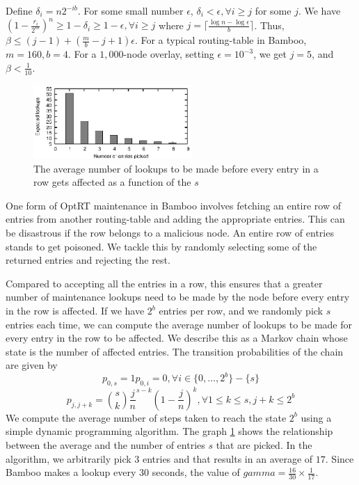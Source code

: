 \documentclass[10pt,twocolumn]{article}
\newcommand{\pow}[2]{\ensuremath{#1}^{#2}}
\newcommand{\PRT}{OptRT\xspace}
\begin{document}
Define $\delta_i=n2^{-ib}$. For some small number $\epsilon$, $\delta_i <\epsilon, \forall i\ge j$ for some $j$. We have $\pow{(1-\frac{r_i}{2^m})}{n}\ge 1-\delta_i \ge 1-\epsilon, \forall i \ge j$ where $j=\lceil \frac{\log n - \log \epsilon}{b} \rceil$. Thus, $\beta \le (j-1)+(\frac{m}{b}-j+1)\epsilon$.
For a typical routing-table in Bamboo, $m=160, b=4$. For a $1,000$-node overlay, setting $\epsilon=\pow{10}{-3}$, we get $j=5$, and $\beta < \frac{1}{10}$.

\SubSection{$\gamma$}
\label{appendix:gamma}
\begin{figure}
\centerline{\includegraphics[width=6cm]{graphs/equations/gamma}}
\caption{The average number of lookups to be made before every entry in a row gets affected as a function of the $s$}
\label{fig:shielding}
\end{figure}

One form of \PRT maintenance in Bamboo involves fetching an entire row of entries from another routing-table and adding the appropriate entries. This can be disastrous if the row belongs to a malicious node. An entire row of entries stands to get poisoned. We tackle this by randomly selecting some of the returned entries and rejecting the rest. 

Compared to accepting all the entries in a row, this ensures that a greater number of maintenance lookups need to be made by the node before every entry in the row is affected. If we have $2^b$ entries per row, and we randomly pick $s$ entries each time, we can compute the average number of lookups to be made for every entry in the row to be affected. We describe this as a Markov chain whose state is the number of affected entries. The transition probabilities of the chain are given by 
\begin{equation}
p_{0,s}=1
p_{0,i}=0, \forall i \in \{0,\ldots,2^b\}-\{s\}
\end{equation}
\begin{equation}
p_{j,j+k}={s \choose k}\pow{\frac{j}{n}}{s-k}\pow{(1-\frac{j}{n})}{k} , \forall 1 \le k \le s, j+k \le 2^b
\end{equation}
We compute the average number of steps taken to reach the state $2^b$
using a simple dynamic programming algorithm. The graph
\ref{fig:shielding} shows the relationship between the average and the
number of entries $s$ that are picked. In the algorithm, we arbitrarily
pick $3$ entries and that results in an average of $17$.  Since Bamboo
makes a lookup every $30$ seconds, the value of
$gamma=\frac{16}{30}\times \frac{1}{17}$.
\end{document}
